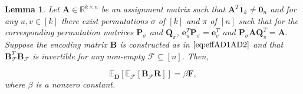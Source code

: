 \documentclass[journal,draftcls,onecolumn]{IEEEtran}
\theoremstyle{mystyle}
\newtheorem{lemma}{Lemma}
\newcommand{\bfD}{\mathbf{D}}
\newcommand{\bfQ}{\mathbf{Q}}
\newcommand{\bfA}{\mathbf{A}}
\newcommand{\bfB}{\mathbf{B}}
\newcommand{\bfP}{\mathbf{P}}
\newcommand{\cF}{\mathcal{F}}
\begin{document}
\begin{lemma}
{\label{lemma:SRG_COSET_unbiasedness}}
Let $\bfA \in \mathbb{R}^{k \times n}$ be an assignment matrix such that $\mathbf{A}^T\mathbf{1}_k\neq \mathbf{0}_n$ and for any $u,v \in [k]$ there exist permutations $\sigma$ of $[k]$ and $\pi$ of $[n]$ such that for the corresponding permutation matrices $\bfP_{\sigma}$ and $\bfQ_{\pi}$, $\mathbf{e}_{u}^T\bfP_{\sigma} = \mathbf{e}_{v}^T$  and $\bfP_{\sigma} \mathbf{A}\bfQ_{\pi}^T = \bfA$. Suppose the encoding matrix $\bfB$ is constructed as in $\eqref{eq:effAD1AD2}$ and that $\bfB_{\cF}^T \bfB_{\cF}$ is invertible for any non-empty $\cF \subseteq [n]$. Then, 

\[ \mathbb{E}_{\mathbf{D}}[\mathbb{E}_{\mathcal{F}}[\mathbf{B}_{\cF} \mathbf{R}]]= \beta\mathbf{F},\]
where $\beta$ is a nonzero constant.

\end{lemma}





\end{document}
